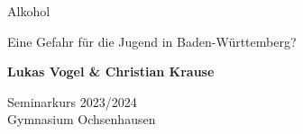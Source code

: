 
\begin{titlepage}
    \begin{center}
        \vspace*{1cm}
 
        {\huge{Alkohol}}
 
        \vspace{0.7cm}
         {\Large Eine Gefahr für die Jugend in Baden-Württemberg?}
             
        \vspace{1cm}
 
        \textbf{Lukas Vogel \& Christian Krause}
 
        \vfill
             
             
        \vspace{0.8cm}
      
        \large
        Seminarkurs 2023/2024\\
        Gymnasium Ochsenhausen\\
             
    \end{center}
 \end{titlepage}